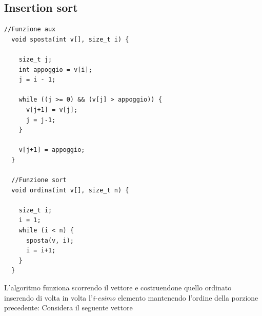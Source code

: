 \subsection{Insertion sort}
\begin{lstlisting}[style = c, frame=none]
  //Funzione aux
  void sposta(int v[], size_t i) {

    size_t j;
    int appoggio = v[i];
    j = i - 1;

    while ((j >= 0) && (v[j] > appoggio)) {
      v[j+1] = v[j];
      j = j-1;
    }

    v[j+1] = appoggio;
  } 

  //Funzione sort
  void ordina(int v[], size_t n) {

    size_t i;
    i = 1;
    while (i < n) {
      sposta(v, i);
      i = i+1;
    }
  }
  \end{lstlisting}
L'algoritmo funziona scorrendo il vettore e costruendone quello ordinato inserendo di volta in volta l'\textit{i-esimo} elemento mantenendo l'ordine della porzione precedente:
Considera il seguente vettore

